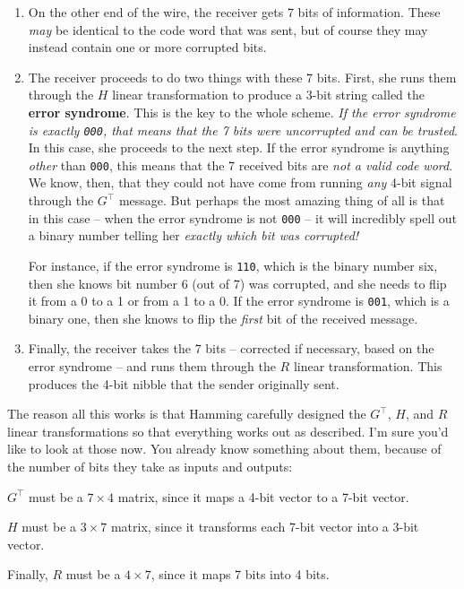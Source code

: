 \begin{alttitles}
\begin{enumerate}

\item On the other end of the wire, the receiver gets 7 bits of information.
These \textit{may} be identical to the code word that was sent, but of course
they may instead contain one or more corrupted bits.

\item The receiver proceeds to do two things with these 7 bits. First, she runs
them through the $H$ linear transformation to produce a 3-bit string called the
\textbf{error syndrome}. This is the key to the whole scheme. \textit{If the
error syndrome is exactly \texttt{000}, that means that the 7 bits were
uncorrupted and can be trusted}. In this case, she proceeds to the next step.
If the error syndrome is anything \textit{other} than \texttt{000}, this means
that the 7 received bits are \textit{not a valid code word}. We know, then, that
they could not have come from running \textit{any} 4-bit signal through the
$G^\intercal$ message. But perhaps the most amazing thing of all is that in
this case -- when the error syndrome is not \texttt{000} -- it will incredibly
spell out a binary number telling her \textit{exactly which bit was corrupted!}

For instance, if the error syndrome is \texttt{110}, which is the binary number
six, then she knows bit number 6 (out of 7) was corrupted, and she needs to
flip it from a 0 to a 1 or from a 1 to a 0. If the error syndrome is
\texttt{001}, which is a binary one, then she knows to flip the \textit{first}
bit of the received message.

\item Finally, the receiver takes the 7 bits -- corrected if necessary, based
on the error syndrome -- and runs them through the $R$ linear transformation.
This produces the 4-bit nibble that the sender originally sent.

\end{enumerate}

The reason all this works is that Hamming carefully designed the $G^\intercal$,
$H$, and $R$ linear transformations so that everything works out as described.
I'm sure you'd like to look at those now. You already know something about
them, because of the number of bits they take as inputs and outputs:

\begin{compactitem}
\item $G^\intercal$ must be a $7\times 4$ matrix, since it maps a 4-bit vector to a
7-bit vector.
\item $H$ must be a $3\times 7$ matrix, since it transforms each 7-bit vector
into a 3-bit vector.
\item Finally, $R$ must be a $4\times 7$, since it maps 7 bits into 4 bits.
\end{compactitem}


\end{alttitles}
